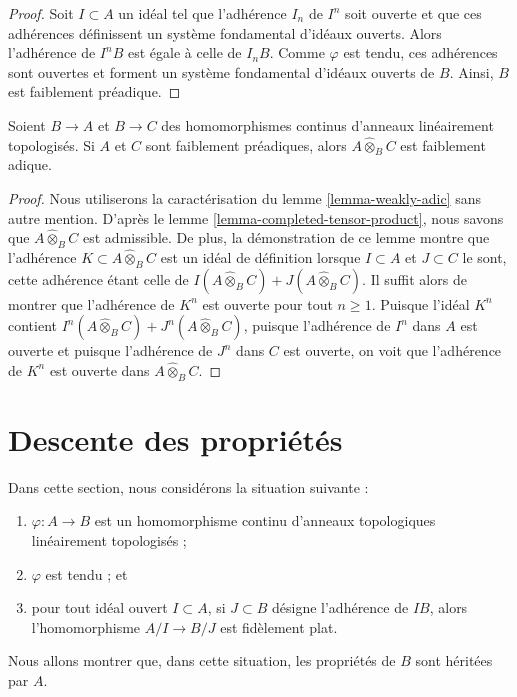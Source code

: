 \begin{proof}
Soit $I \subset A$ un idéal tel que l'adhérence $I_n$ de $I^n$
soit ouverte et que ces adhérences définissent un système fondamental d'idéaux ouverts.
Alors l'adhérence de $I^nB$ est égale à celle de $I_nB$.
Comme $\varphi$ est tendu, ces adhérences sont ouvertes et forment un système fondamental
d'idéaux ouverts de $B$. Ainsi, $B$ est faiblement préadique.
\end{proof}

\begin{lemma}
\label{lemma-completed-tensor-product-weakly-adic}
Soient $B \to A$ et $B \to C$ des homomorphismes continus d'anneaux
linéairement topologisés. Si $A$ et $C$ sont faiblement préadiques, alors
$A \widehat{\otimes}_B C$ est faiblement adique.
\end{lemma}

\begin{proof}
Nous utiliserons la caractérisation du lemme \ref{lemma-weakly-adic}
sans autre mention. D'après le lemme \ref{lemma-completed-tensor-product},
nous savons que $A \widehat{\otimes}_B C$ est admissible.
De plus, la démonstration de ce lemme montre que
l'adhérence $K \subset A \widehat{\otimes}_B C$
est un idéal de définition lorsque $I \subset A$ et $J \subset C$
le sont, cette adhérence étant celle de $I(A \widehat{\otimes}_B C) + J(A \widehat{\otimes}_B C)$.
Il suffit alors de montrer que
l'adhérence de $K^n$ est ouverte pour tout $n \geq 1$.
Puisque l'idéal $K^n$ contient
$I^n(A \widehat{\otimes}_B C) + J^n(A \widehat{\otimes}_B C)$,
puisque l'adhérence de $I^n$ dans $A$ est ouverte et
puisque l'adhérence de $J^n$ dans $C$ est ouverte, on
voit que l'adhérence de $K^n$ est ouverte dans $A \widehat{\otimes}_B C$.
\end{proof}






\section{Descente des propriétés}
\label{section-taut-descent}

\noindent
Dans cette section, nous considérons la situation suivante :
\begin{enumerate}
\item $\varphi : A \to B$ est un homomorphisme continu d'anneaux
topologiques linéairement topologisés ;
\item $\varphi$ est tendu ; et
\item pour tout idéal ouvert $I \subset A$, si $J \subset B$
désigne l'adhérence de $IB$, alors l'homomorphisme $A/I \to B/J$
est fidèlement plat.
\end{enumerate}
Nous allons montrer que, dans cette situation, les propriétés de $B$ sont héritées
par $A$.

